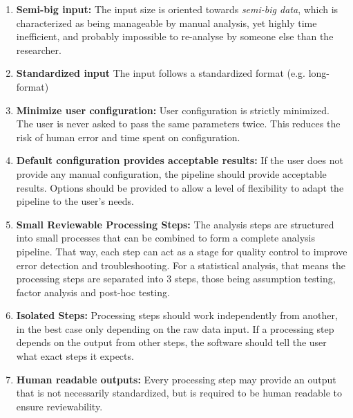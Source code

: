 \begin{enumerate}
      \item \textbf{Semi-big input:} The input size is oriented towards
            \textit{semi-big data}, which is characterized as being manageable by
            manual analysis, yet highly time inefficient, and probably impossible
            to re-analyse by someone else than the researcher.
      \item \textbf{Standardized input} The input follows a standardized format (e.g. long-format)
      \item \textbf{Minimize user configuration:} User configuration is strictly
            minimized. The user is never asked to pass the same parameters twice. This
            reduces the risk of human error and time spent on configuration.
      \item \textbf{Default configuration provides acceptable results:} If the
            user does not provide any manual configuration, the pipeline should
            provide acceptable results. Options should be provided to allow a
            level of flexibility to adapt the pipeline to the user's needs.
      \item \textbf{Small Reviewable Processing Steps:} The analysis steps are
            structured into small processes that can be combined to form a
            complete analysis pipeline. That way, each step can act as a stage for
            quality control to improve error detection and troubleshooting. For a
            statistical analysis, that means the processing steps are separated
            into 3 steps, those being assumption testing, factor analysis and
            post-hoc testing.
      \item \textbf{Isolated Steps:} Processing steps should work independently
            from another, in the best case only depending on the raw data input.
            If a processing step depends on the output from other steps, the
            software should tell the user what exact steps it expects.
      \item \textbf{Human readable outputs:} Every processing step may provide
            an output that is not necessarily standardized, but is required to be
            human readable to ensure reviewability.

\end{enumerate}


